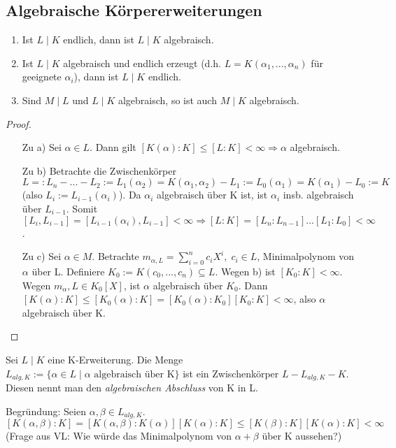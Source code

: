 \documentclass[../main.tex]{subfiles}
\begin{document}
\subsection{Algebraische Körpererweiterungen}
\begin{theorem}
    \begin{enumerate}
        \item Ist $L \mid K$ endlich, dann ist $L \mid K$ algebraisch.
        \item Ist $L \mid K$ algebraisch und endlich erzeugt (d.h. $L = K(\alpha_1, ..., \alpha_n)$ für geeignete $\alpha_i$), dann ist $L \mid K$ endlich.
        \item Sind $M \mid L$ und $L \mid K$ algebraisch, so ist auch $M \mid K$ algebraisch.
    \end{enumerate}
\end{theorem}
\begin{proof}
    \begin{itemize}
        \item[Zu a)] Sei $\alpha \in L$. Dann gilt $[K(\alpha):K] \leq [L:K] < \infty \Rightarrow \alpha$ algebraisch.
        \item[Zu b)] Betrachte die Zwischenkörper $L =: L_n - ... - L_2 := L_1(\alpha_2) = K(\alpha_1, \alpha_2) - L_1 := L_0(\alpha_1) = K(\alpha_1) - L_0 := K$ (also $L_i := L_{i-1}(\alpha_i)$). Da $\alpha_i$ algebraisch über K ist, ist $\alpha_i$ insb. algebraisch über $L_{i-1}$. Somit $[L_i, L_{i-1}] = [L_{i-1}(\alpha_i), L_{i-1}] < \infty \Rightarrow [L:K] = [L_n:L_{n-1}]...[L_1:L_0] < \infty$.
        \item[Zu c)] Sei $\alpha \in M$. Betrachte $m_{\alpha,L} = \sum_{i=0}^n c_iX^i, \; c_i \in L$, Minimalpolynom von $\alpha$ über L. Definiere $K_0 := K(c_0,...,c_n) \subseteq L$. Wegen b) ist $[K_0:K] < \infty$. Wegen $m_\alpha,L \in K_0[X]$, ist $\alpha$ algebraisch über $K_0$. Dann $[K(\alpha):K] \leq [K_0(\alpha):K] = [K_0(\alpha):K_0][K_0:K] < \infty$, also $\alpha$ algebraisch über K.
    \end{itemize}
\end{proof}
\begin{remark}
Sei $L \mid K$ eine K-Erweiterung. Die Menge $L_{alg, K} := \{\alpha \in L \mid \alpha \text{ algebraisch über K}\}$ ist ein Zwischenkörper $L-L_{alg, K}-K$. Diesen nennt man den \emph{algebraischen Abschluss} von K in L.

Begründung: Seien $\alpha, \beta \in L_{alg,K}$. $$[K(\alpha,\beta):K]=[K(\alpha,\beta):K(\alpha)][K(\alpha):K] \leq [K(\beta):K][K(\alpha):K] < \infty$$ (Frage aus VL: Wie würde das Minimalpolynom von $\alpha + \beta$ über K aussehen?)
\end{remark}
\end{document}
